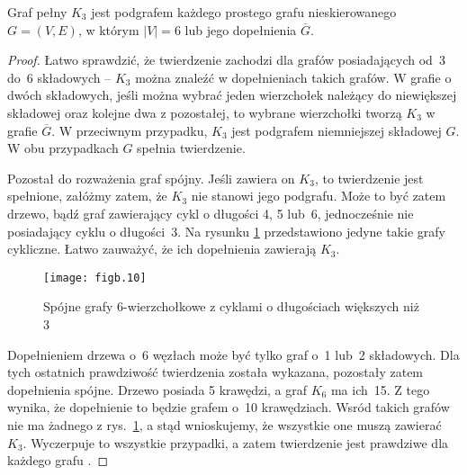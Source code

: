 \subexercise{} %
\begin{twierdzenie}
	Graf pełny $K_3$ jest podgrafem każdego prostego grafu nieskierowanego $G=(V,E)$, w którym $|V|=6$ lub jego dopełnienia $\overline{G}$.
\end{twierdzenie}
\begin{proof}
Łatwo sprawdzić, że twierdzenie zachodzi dla grafów posiadających od~3 do~6 składowych -- $K_3$ można znaleźć w dopełnieniach takich grafów. W grafie o dwóch składowych, jeśli można wybrać jeden wierzchołek należący do niewiększej składowej oraz kolejne dwa z pozostałej, to wybrane wierzchołki tworzą $K_3$ w grafie $\overline{G}$. W przeciwnym przypadku, $K_3$ jest podgrafem niemniejszej składowej $G$. W obu przypadkach $G$ spełnia twierdzenie.

Pozostał do rozważenia graf spójny. Jeśli zawiera on $K_3$, to twierdzenie jest spełnione, załóżmy zatem, że $K_3$ nie stanowi jego podgrafu. Może to być zatem drzewo, bądź graf zawierający cykl o długości 4, 5 lub~6, jednocześnie nie posiadający cyklu o długości~3. Na rysunku \ref{fig:B-2b} przedstawiono jedyne takie grafy cykliczne. Łatwo zauważyć, że ich dopełnienia zawierają $K_3$.
\begin{figure}[ht]
	\begin{center}
		\texttt{[image: figb.10]}
	\end{center}
	\caption{Spójne grafy 6-wierzchołkowe z cyklami o długościach większych niż 3} \label{fig:B-2b}
\end{figure}
Dopełnieniem drzewa o~6 węzłach może być tylko graf o~1 lub~2 składowych. Dla tych ostatnich prawdziwość twierdzenia została wykazana, pozostały zatem dopełnienia spójne. Drzewo  posiada 5 krawędzi, a graf $K_6$ ma ich~15. Z tego wynika, że dopełnienie to będzie grafem o~10 krawędziach. Wsród takich grafów nie ma żadnego z rys.~\ref{fig:B-2b}, a stąd wnioskujemy, że wszystkie one muszą zawierać $K_3$. Wyczerpuje to wszystkie przypadki, a zatem twierdzenie jest prawdziwe dla każdego grafu .

\end{proof}

